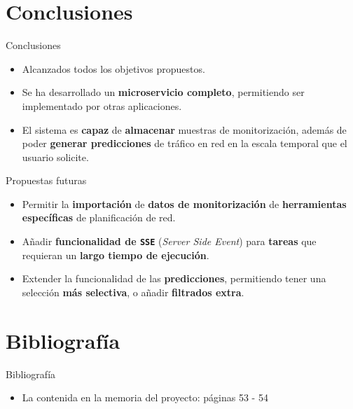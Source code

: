 \documentclass[aspectratio=169,xcolor=dvipsnames]{beamer}
\begin{document}
	
	\section{Conclusiones}
	
	\begin{frame}{Conclusiones}
		\begin{itemize}
			\item Alcanzados todos los objetivos propuestos.
			
			\item Se ha desarrollado un \textbf{microservicio completo}, permitiendo ser implementado por otras aplicaciones.
			
			\item El sistema es \textbf{capaz} de \textbf{almacenar} muestras de monitorización, además de poder \textbf{generar predicciones} de tráfico en red en la escala temporal que el usuario solicite.
		\end{itemize}
	
		\begin{exampleblock}{Propuestas futuras}
			\begin{itemize}
				\item Permitir la \textbf{importación} de \textbf{datos de monitorización} de \textbf{herramientas específicas} de planificación de red.
				
				\item Añadir \textbf{funcionalidad de \texttt{SSE}} (\textit{Server Side Event}) para \textbf{tareas} que requieran un \textbf{largo tiempo de ejecución}.
				
				\item Extender la funcionalidad de las \textbf{predicciones}, permitiendo tener una selección \textbf{más selectiva}, o añadir \textbf{filtrados extra}.
			\end{itemize}
		\end{exampleblock}
	\end{frame}
	
	
	\section{Bibliografía}
	
	\begin{frame}{Bibliografía}
		\begin{itemize}
		    \item La contenida en la memoria del proyecto: páginas 53 - 54
		\end{itemize}
	\end{frame}
	
\end{document}
